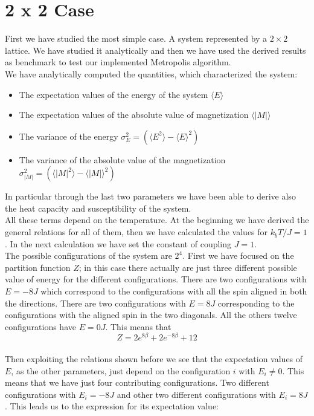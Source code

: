 \documentclass[10pt,a4paper,titlepage]{article}
\begin{document}
\section*{2 x 2 Case} 
\noindent First we have studied the most simple case. A system represented by a $2 \times 2 $ lattice. We have studied it analytically and then we have used the derived results as benchmark to test our implemented Metropolis algorithm.
\\ 
We have analytically computed the quantities, which characterized the system: 
\begin{itemize}
\item The expectation values of the energy of the system $\langle E \rangle$
\item  The expectation values of the absolute value of magnetization $\langle |M| \rangle$
\item The variance of the energy $\sigma ^2_E= (\langle E^2\rangle-\langle E \rangle ^2)$
\item The variance of the absolute value of the magnetization $\sigma^2_{|M|}= (\langle |M|^2\rangle-\langle |M| \rangle ^2)$
\end{itemize}
In particular through the last two parameters we have been able to derive also the heat capacity and susceptibility of the system. 
\\
All these terms depend on the temperature. At the beginning we have derived the general relations for all of them, then we have calculated the values for $k_b T/ J=1$.
In the next calculation we have set the constant of coupling $J=1$. \\
The possible configurations of the system are $2^4$. 
First we have focused on the partition function $Z$; in this case there actually are just three different possible value of energy for the different configurations. 
There are two configurations with $E=-8J$ which correspond to the configurations with all the spin aligned in both the directions. There are two configurations with $E=8J$ corresponding to the configurations with the aligned spin in the two diagonals. All the others twelve configurations have $E=0J$.
This means that $$Z=2 e^{ 8 \beta }+2e^{- 8 \beta }+12$$
\\
Then exploiting the relations shown before we see that the expectation values of $E$, as the other parameters, just depend on the configuration $i$ with $E_i \neq 0$. 
This means that we have just four contributing configurations.  Two different configurations with $E_i=-8J$ and other two different configurations with $E_i= 8J$. This leads us to the expression for its expectation value:  
\end{document}
